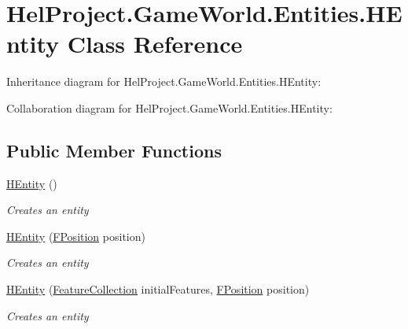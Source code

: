 \hypertarget{class_hel_project_1_1_game_world_1_1_entities_1_1_h_entity}{}\section{Hel\+Project.\+Game\+World.\+Entities.\+H\+Entity Class Reference}
\label{class_hel_project_1_1_game_world_1_1_entities_1_1_h_entity}


Inheritance diagram for Hel\+Project.\+Game\+World.\+Entities.\+H\+Entity\+:


Collaboration diagram for Hel\+Project.\+Game\+World.\+Entities.\+H\+Entity\+:
\subsection*{Public Member Functions}
\begin{DoxyCompactItemize}
\item 
\hyperlink{class_hel_project_1_1_game_world_1_1_entities_1_1_h_entity_a0f76dfa203f3b1802a15d809b4c33170}{H\+Entity} ()
\begin{DoxyCompactList}\small\item\em Creates an entity \end{DoxyCompactList}\item 
\hyperlink{class_hel_project_1_1_game_world_1_1_entities_1_1_h_entity_a7d78007869c12e256a2837c9d4733b40}{H\+Entity} (\hyperlink{class_hel_project_1_1_tools_1_1_f_position}{F\+Position} position)
\begin{DoxyCompactList}\small\item\em Creates an entity \end{DoxyCompactList}\item 
\hyperlink{class_hel_project_1_1_game_world_1_1_entities_1_1_h_entity_affca20b99d4d8791ffe00fb96ad7a9e0}{H\+Entity} (\hyperlink{class_hel_project_1_1_features_1_1_feature_collection}{Feature\+Collection} initial\+Features, \hyperlink{class_hel_project_1_1_tools_1_1_f_position}{F\+Position} position)
\begin{DoxyCompactList}\small\item\em Creates an entity \end{DoxyCompactList}\end{DoxyCompactItemize}
